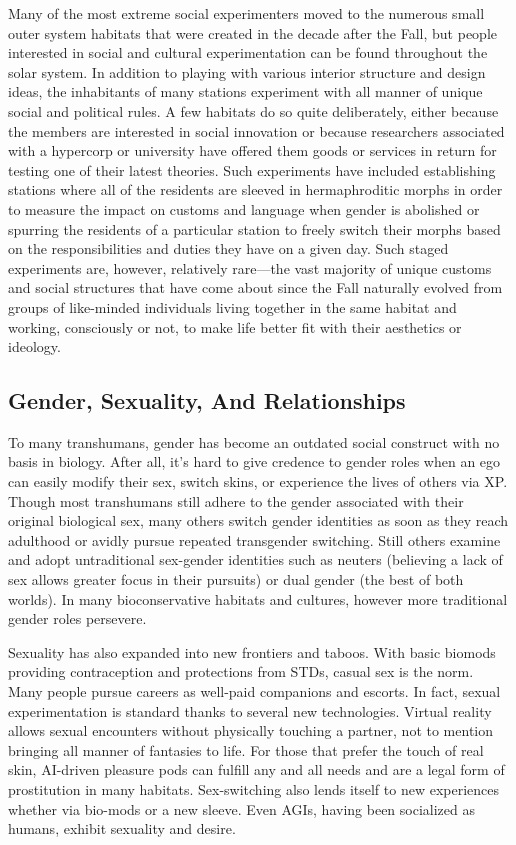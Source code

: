 Many of the most extreme social experimenters 
moved to the numerous small outer system habitats 
that were created in the decade after the Fall, but 
people interested in social and cultural experimentation
can be found throughout the solar system. In addition
to playing with various interior structure and
design ideas, the inhabitants of many stations experiment
with all manner of unique social and political
rules. A few habitats do so quite deliberately, either 
because the members are interested in social innovation
or because researchers associated with a hypercorp
or university have offered them goods or services
in return for testing one of their latest theories. Such 
experiments have included establishing stations where 
all of the residents are sleeved in hermaphroditic 
morphs in order to measure the impact on customs 
and language when gender is abolished or spurring 
the residents of a particular station to freely switch 
their morphs based on the responsibilities and duties 
they have on a given day. Such staged experiments are, 
however, relatively rare—the vast majority of unique 
customs and social structures that have come about 
since the Fall naturally evolved from groups of like-minded
individuals living together in the same habitat
and working, consciously or not, to make life better 
fit with their aesthetics or ideology.

\subsection{Gender, Sexuality, And Relationships}

To many transhumans, gender has become an outdated
social construct with no basis in biology. After all,
it's hard to give credence to gender roles when an ego 
can easily modify their sex, switch skins, or experience 
the lives of others via XP. Though most transhumans 
still adhere to the gender associated with their original 
biological sex, many others switch gender identities 
as soon as they reach adulthood or avidly pursue 
repeated transgender switching. Still others examine 
and adopt untraditional sex-gender identities such as 
neuters (believing a lack of sex allows greater focus in 
their pursuits) or dual gender (the best of both worlds). 
In many bioconservative habitats and cultures, however
more traditional gender roles persevere.

Sexuality has also expanded into new frontiers and 
taboos. With basic biomods providing contraception 
and protections from STDs, casual sex is the norm. 
Many people pursue careers as well-paid companions 
and escorts. In fact, sexual experimentation is standard
thanks to several new technologies. Virtual reality
allows sexual encounters without physically touching
a partner, not to mention bringing all manner of
fantasies to life. For those that prefer the touch of real 
skin, AI-driven pleasure pods can fulfill any and all 
needs and are a legal form of prostitution in many 
habitats. Sex-switching also lends itself to new experiences
whether via bio-mods or a new sleeve. Even
AGIs, having been socialized as humans, exhibit sexuality
and desire.

